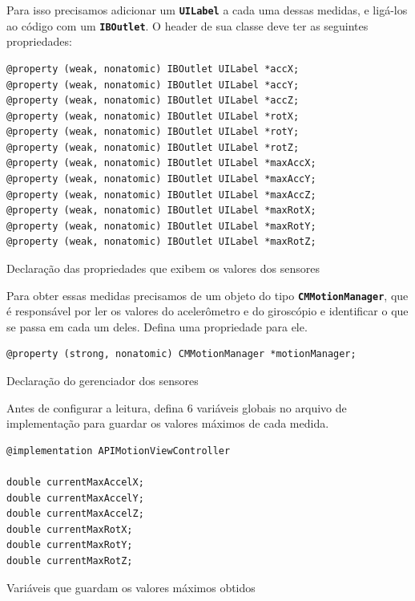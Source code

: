 \documentclass[a4paper,12pt,brazil,oneside]{book}
\begin{document}
Para isso precisamos adicionar um \texttt{\textbf{UILabel}} a cada uma dessas medidas, e ligá-los ao código com um \texttt{\textbf{IBOutlet}}. O header de sua classe deve ter as seguintes propriedades:

\begin{listing}[H]
\begin{verbatim}
@property (weak, nonatomic) IBOutlet UILabel *accX;
@property (weak, nonatomic) IBOutlet UILabel *accY;
@property (weak, nonatomic) IBOutlet UILabel *accZ;
@property (weak, nonatomic) IBOutlet UILabel *rotX;
@property (weak, nonatomic) IBOutlet UILabel *rotY;
@property (weak, nonatomic) IBOutlet UILabel *rotZ;
@property (weak, nonatomic) IBOutlet UILabel *maxAccX;
@property (weak, nonatomic) IBOutlet UILabel *maxAccY;
@property (weak, nonatomic) IBOutlet UILabel *maxAccZ;
@property (weak, nonatomic) IBOutlet UILabel *maxRotX;
@property (weak, nonatomic) IBOutlet UILabel *maxRotY;
@property (weak, nonatomic) IBOutlet UILabel *maxRotZ;
\end{verbatim}
\caption{Declaração das propriedades que exibem os valores dos sensores}
\end{listing}


Para obter essas medidas precisamos de um objeto do tipo \texttt{\textbf{CMMotionManager}}, que é responsável por ler os valores do acelerômetro e do giroscópio e identificar o que se passa em cada um deles. Defina uma propriedade para ele.

\begin{listing}[H]
\begin{verbatim}
@property (strong, nonatomic) CMMotionManager *motionManager;
\end{verbatim}
\caption{Declaração do gerenciador dos sensores}
\end{listing}


Antes de configurar a leitura, defina 6 variáveis globais no arquivo de implementação para guardar os valores máximos de cada medida.

\begin{listing}[H]
\begin{verbatim}
@implementation APIMotionViewController

double currentMaxAccelX;
double currentMaxAccelY;
double currentMaxAccelZ;
double currentMaxRotX;
double currentMaxRotY;
double currentMaxRotZ;
\end{verbatim}
\caption{Variáveis que guardam os valores máximos obtidos}
\end{listing}
\end{document}

